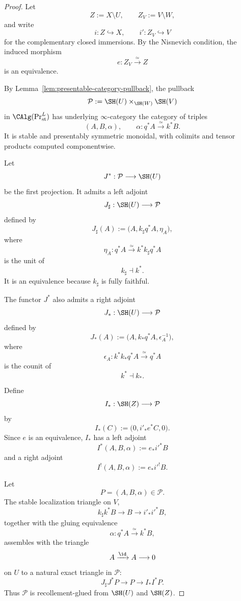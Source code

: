 \begin{proof}
Let
\[
    Z:=X\setminus U,
    \qquad
    Z_V:=V\setminus W,
\]
and write
\[
    i:Z\hookrightarrow X,
    \qquad
    i':Z_V\hookrightarrow V
\]
for the complementary closed immersions.  By the Nisnevich condition, the
induced morphism
\[
    e:Z_V\xrightarrow{\simeq}Z
\]
is an equivalence.

By Lemma~\ref{lem:presentable-category-pullback}, the pullback
\[
    \mathcal P
    :=
    \SH(U)\times_{\SH(W)}\SH(V)
\]
in \(\CAlg(\Pr^L_{\mathrm{st}})\) has underlying \(\infty\)-category the
category of triples
\[
    (A,B,\alpha),
    \qquad
    \alpha:q^*A\xrightarrow{\simeq}k^*B.
\]
It is stable and presentably symmetric monoidal, with colimits and tensor
products computed componentwise.

Let
\[
    J^*:
    \mathcal P
    \longrightarrow
    \SH(U)
\]
be the first projection.  It admits a left adjoint
\[
    J_\sharp:
    \SH(U)
    \longrightarrow
    \mathcal P
\]
defined by
\[
    J_\sharp(A)
    :=
    \bigl(
      A,
      k_\sharp q^*A,
      \eta_A
    \bigr),
\]
where
\[
    \eta_A:
    q^*A
    \xrightarrow{\simeq}
    k^*k_\sharp q^*A
\]
is the unit of
\[
    k_\sharp\dashv k^*.
\]
It is an equivalence because \(k_\sharp\) is fully faithful.

The functor \(J^*\) also admits a right adjoint
\[
    J_*:
    \SH(U)
    \longrightarrow
    \mathcal P
\]
defined by
\[
    J_*(A)
    :=
    \bigl(
      A,
      k_*q^*A,
      \epsilon_A^{-1}
    \bigr),
\]
where
\[
    \epsilon_A:
    k^*k_*q^*A
    \xrightarrow{\simeq}
    q^*A
\]
is the counit of
\[
    k^*\dashv k_*.
\]

Define
\[
    I_*:
    \SH(Z)
    \longrightarrow
    \mathcal P
\]
by
\[
    I_*(C)
    :=
    \bigl(
      0,
      i'_*e^*C,
      0
    \bigr).
\]
Since \(e\) is an equivalence, \(I_*\) has a left adjoint
\[
    I^*(A,B,\alpha)
    :=
    e_*i'^*B
\]
and a right adjoint
\[
    I^!(A,B,\alpha)
    :=
    e_*i'^!B.
\]

Let
\[
    P=(A,B,\alpha)\in\mathcal P.
\]
The stable localization triangle on \(V\),
\[
    k_\sharp k^*B
    \longrightarrow
    B
    \longrightarrow
    i'_*i'^*B,
\]
together with the gluing equivalence
\[
    \alpha:q^*A\xrightarrow{\simeq}k^*B,
\]
assembles with the triangle
\[
    A\xrightarrow{\id}A\longrightarrow0
\]
on \(U\) to a natural exact triangle in \(\mathcal P\):
\[
    J_\sharp J^*P
    \longrightarrow
    P
    \longrightarrow
    I_*I^*P.
\]
Thus \(\mathcal P\) is recollement-glued from \(\SH(U)\) and \(\SH(Z)\).


\end{proof}
